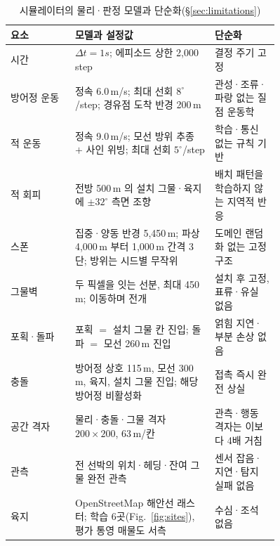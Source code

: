 \begin{table}[tp]
\centering
\caption{시뮬레이터의 물리·판정 모델과 단순화(\S\ref{sec:limitations})}
\label{tab:simfidelity}
\footnotesize
\renewcommand{\arraystretch}{1.2}
\begin{tabular}{lp{0.52\linewidth}p{0.24\linewidth}}
\toprule
요소 & 모델과 설정값 & 단순화 \\
\midrule
시간 & $\Delta t = 1\unit{s}$; 에피소드 상한 2{,}000\,step & 결정 주기 고정 \\
방어정 운동 & 정속 6.0\,m/s; 최대 선회 $8^\circ$/step; 경유점 도착 반경 200\,m & 관성·조류·파랑 없는 질점 운동학 \\
적 운동 & 정속 9.0\,m/s; 모선 방위 추종 $+$ 사인 위빙; 최대 선회 $5^\circ$/step & 학습·통신 없는 규칙 기반 \\
적 회피 & 전방 500\,m 의 설치 그물·육지에 $\pm32^\circ$ 측면 조향 & 배치 패턴을 학습하지 않는 지역적 반응 \\
스폰 & 집중·양동 반경 5{,}450\,m; 파상 4{,}000\,m 부터 1{,}000\,m 간격 3단; 방위는 시드별 무작위 & 도메인 랜덤화 없는 고정 구조 \\
그물벽 & 두 픽셀을 잇는 선분, 최대 450\,m; 이동하며 전개 & 설치 후 고정, 표류·유실 없음 \\
포획·돌파 & 포획 $=$ 설치 그물 칸 진입; 돌파 $=$ 모선 260\,m 진입 & 얽힘 지연·부분 손상 없음 \\
충돌 & 방어정 상호 115\,m, 모선 300\,m, 육지, 설치 그물 진입; 해당 방어정 비활성화 & 접촉 즉시 완전 상실 \\
공간 격자 & 물리·충돌·그물 격자 $200\times200$, 63\,m/칸 & 관측·행동 격자는 이보다 4배 거침 \\
관측 & 전 선박의 위치·헤딩·잔여 그물 완전 관측 & 센서 잡음·지연·탐지 실패 없음 \\
육지 & OpenStreetMap 해안선 래스터; 학습 6곳(Fig.~\ref{fig:sites}), 평가 통영 매물도 서측 & 수심·조석 없음 \\
\bottomrule
\end{tabular}
\end{table}
